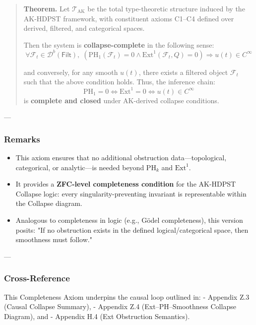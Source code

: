 \documentclass[11pt]{article}
\begin{document}
\begin{axiom}
\begin{axiom}
{{\begin{quote}
\textbf{Theorem.}  
Let \( \mathcal{T}_{\text{AK}} \) be the total type-theoretic structure induced by the AK-HDPST framework,  
with constituent axioms C1–C4 defined over derived, filtered, and categorical spaces.

Then the system is \textbf{collapse-complete} in the following sense:
\[
\forall \mathcal{F}_t \in \mathcal{D}^b(\mathsf{Filt}),\;
\left( \mathrm{PH}_1(\mathcal{F}_t) = 0 \land \mathrm{Ext}^1(\mathcal{F}_t, Q) = 0 \right)
\Rightarrow u(t) \in C^\infty
\]

and conversely, for any smooth \( u(t) \), there exists a filtered object \( \mathcal{F}_t \) such that the above condition holds.  
Thus, the inference chain:
\[
\mathrm{PH}_1 = 0 \Leftrightarrow \mathrm{Ext}^1 = 0 \Leftrightarrow u(t) \in C^\infty
\]
is \textbf{complete and closed} under AK-derived collapse conditions.
\end{quote}

---

\subsubsection*{Remarks}

\begin{itemize}
  \item This axiom ensures that no additional obstruction data—topological, categorical, or analytic—is needed beyond \(\mathrm{PH}_k\) and \(\mathrm{Ext}^1\).
  \item It provides a \textbf{ZFC-level completeness condition} for the AK-HDPST Collapse logic:  
  every singularity-preventing invariant is representable within the Collapse diagram.
  \item Analogous to completeness in logic (e.g., Gödel completeness), this version posits:  
  "If no obstruction exists in the defined logical/categorical space, then smoothness must follow."
\end{itemize}

---

\subsubsection*{Cross-Reference}

This Completeness Axiom underpins the causal loop outlined in:
- Appendix Z.3 (Causal Collapse Summary),
- Appendix Z.4 (Ext–PH–Smoothness Collapse Diagram), and
- Appendix H.4 (Ext Obstruction Semantics).

}}
\end{axiom}
\end{axiom}
\end{document}
